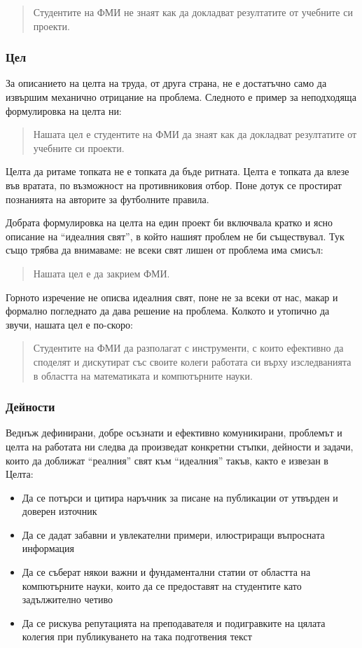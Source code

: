 \documentclass[11pt, oneside]{article}     %
\begin{document}
\begin{quote}
  Студентите на ФМИ не знаят как да докладват резултатите от учебните си проекти.
\end{quote}

\subsubsection*{Цел}
За описанието на целта на труда, от друга страна, не е достатъчно само да извършим механично отрицание на проблема. Следното е пример за неподходяща формулировка на целта ни:

\begin{quote}
  Нашата цел е студентите на ФМИ да знаят как да докладват резултатите от учебните си проекти.  
\end{quote}
Целта да ритаме топката не е топката да бъде ритната. Целта е топката да влезе във вратата, по възможност на противниковия отбор. Поне дотук се простират познанията на авторите за футболните правила.

Добрата формулировка на целта на един проект би включвала кратко и ясно описание на ``идеалния свят'', в който нашият проблем не би съществувал. Тук също трябва да внимаваме: не всеки свят лишен от проблема има смисъл:
\begin{quote}
  Нашата цел е да закрием ФМИ.
\end{quote}
Горното изречение не описва идеалния свят, поне не за всеки от нас, макар и формално погледнато да дава решение на проблема. Колкото и утопично да звучи, нашата цел е по-скоро:
\begin{quote}
  Студентите на ФМИ да разполагат с инструменти, с които ефективно да споделят и дискутират със своите колеги работата си върху изследванията в областта на математиката и компютърните науки.
\end{quote}

\subsubsection*{Дейности}
Веднъж дефинирани, добре осъзнати и ефективно комуникирани, проблемът и целта на работата ни следва да произведат конкретни стъпки, дейности и задачи, които да доближат ``реалния'' свят към ``идеалния'' такъв, както е извезан в Целта:
\begin{itemize}
\item Да се потърси и цитира наръчник за писане на публикации от утвърден и доверен източник
\item Да се дадат забавни и увлекателни примери, илюстриращи въпросната информация
\item Да се съберат някои важни и фундаментални статии от областта на компютърните науки, които да се предоставят на студентите като задължително четиво
\item Да се рискува репутацията на преподавателя и подигравките на цялата колегия при публикуването на така подготвения текст
\end{itemize}
\end{document}
